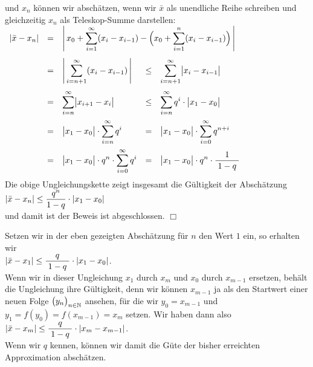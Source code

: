 und $x_n$ k\"onnen wir absch\"atzen, wenn wir $\bar{x}$ als unendliche Reihe schreiben und gleichzeitig
$x_n$ als Teleskop-Summe darstellen: 
\\[0.2cm]
\hspace*{1.3cm}
$
\begin{array}[t]{lclcl}
       |\bar{x} - x_n| 
& = & \multicolumn{3}{l}{\ds\left|\, x_0 + \sum\limits_{i=1}^\infty (x_i - x_{i-1}) - \Bigl(x_0 + \sum\limits_{i=1}^n (x_i - x_{i-1}) \Bigr) \,\right|} \\[0.6cm]
& = & \ds \left|\, \sum\limits_{i=n+1}^\infty (x_i - x_{i-1}) \,\right| & \leq & \ds\sum\limits_{i=n+1}^\infty \bigl|x_i - x_{i-1}\bigr| \\[0.6cm]
& = & \ds \sum\limits_{i=n}^\infty \bigl|x_{i+1} - x_{i}\bigr| & \leq & \ds\sum\limits_{i=n}^\infty q^i \cdot  \bigl|x_1 - x_0\bigr| \\[0.5cm]
& = & \ds \bigl|x_1 - x_0\bigr| \cdot  \sum\limits_{i=n}^\infty q^i & = & \ds\bigl|x_1 - x_0\bigr| \cdot  \sum\limits_{i=0}^\infty q^{n+i} \\[0.5cm]
& = & \ds \bigl|x_1 - x_0\bigr| \cdot  q^{n} \cdot  \sum\limits_{i=0}^\infty q^i & = & \ds\bigl|x_1 - x_0\bigr| \cdot  q^{n} \cdot  \bruch{1}{1 - q} \\[0.5cm]
\end{array}
$
\\[0.2cm]
Die obige Ungleichungskette zeigt insgesamt die G\"ultigkeit der Absch\"atzung 
\\[0.2cm]
\hspace*{1.3cm}
$\displaystyle|\bar{x} - x_n| \leq \frac{q^n}{1 - q} \cdot  |x_1 - x_0|$
\\[0.2cm]
und damit ist der Beweis ist abgeschlossen. \hspace*{\fill} $\Box$
\vspace*{0.3cm}

Setzen wir in der eben gezeigten Absch\"atzung f\"ur  $n$ den Wert $1$ ein, so erhalten wir 
\\[0.2cm]
\hspace*{1.3cm}
$|\bar{x} - x_1| \leq \displaystyle\frac{\;\displaystyle q\;}{\;\displaystyle1 - q\;} \cdot |x_1 - x_0|$. 
\\[0.2cm]
Wenn wir in dieser Ungleichung $x_1$ durch $x_{m}$ und $x_0$ durch $x_{m-1}$ ersetzen,
beh\"alt die Ungleichung ihre G\"ultigkeit, denn wir k\"onnen $x_{m-1}$  ja als den
Startwert einer neuen Folge $\bigl(y_n\bigr)_{n\in\mathbb{N}}$ ansehen, f\"ur die wir $y_0 = x_{m-1}$ und 
$y_1 = f(y_0) = f(x_{m-1}) = x_{m}$ setzen.  Wir haben dann also 
\\[0.2cm]
\hspace*{1.3cm}
$|\bar{x} - x_{m}| \leq \displaystyle\frac{\;\displaystyle q\;}{\;\displaystyle1 - q\;} \cdot  |x_m - x_{m-1}|$.
\\[0.2cm]
Wenn wir $q$ kennen, k\"onnen wir damit die G\"ute der bisher erreichten Approximation
absch\"atzen.

